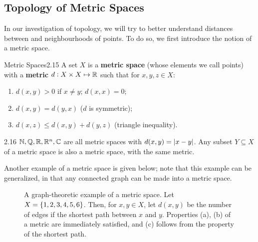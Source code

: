 \subsection{Topology of Metric Spaces}
In our investigation of topology, we will try to better understand distances between and neighbourhoods of points. To do so, we first introduce the notion of a metric space.
\begin{definition}{Metric Spaces}{2.15}
    A set $X$ is a \textbf{metric space} (whose elements we call points) with a \textbf{metric} $d: X \times X \mapsto \mathbb{R}$ such that for $x, y, z \in X$:
    \begin{enumerate}
        \item $d(x, y) > 0$ if $x \neq y$; $d(x, x) = 0$;
        \item $d(x, y) = d(y, x)$ ($d$ is symmetric);
        \item $d(x, z) \leq d(x, y) + d(y, z)$ (triangle inequality).
    \end{enumerate}
\end{definition}
\begin{example}{}{2.16}
    $\mathbb{N}, \mathbb{Q}, \mathbb{R}, \mathbb{R}^n, \mathbb{C}$ are all metric spaces with $d(x, y) = \abs{x - y}$. Any subset $Y \subseteq X$ of a metric space is also a metric space, with the same metric. 
\end{example}
\noindent Another example of a metric space is given below; note that this example can be generalized, in that any connected graph can be made into a metric space. 
\begin{figure}[htbp]
    \centering
    
    \caption{A graph-theoretic example of a metric space. Let $X = \set{1, 2, 3, 4, 5, 6}$. Then, for $x, y \in X$, let $d(x, y)$ be the number of edges if the shortest path between $x$ and $y$. Properties (a), (b) of a metric are immediately satisfied, and (c) follows from the property of the shortest path.}
    \label{fig5}
\end{figure}


